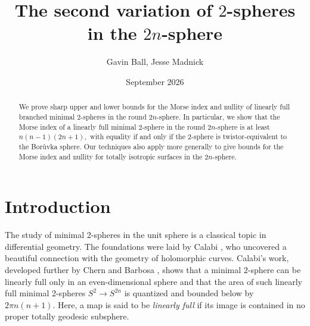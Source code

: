 \documentclass[11pt]{article}
\theoremstyle{definition}
\numberwithin{equation}{section}
\begin{document}
	
\title{The second variation of $2$-spheres in the $2n$-sphere}
	
\author{Gavin Ball, Jesse Madnick}
\date{September 2026}

\newcommand{\Addresses}
{{  \bigskip
\noindent	\textsc{University of Missouri} \par\nopagebreak
\noindent	\textsc{Columbia, MO, United States} \par\nopagebreak
\noindent	\texttt{gavin.ball@missouri.edu} \\

\medskip
\noindent	\textsc{Seton Hall University} \par\nopagebreak
\noindent	\textsc{South Orange, NJ, United States} \par\nopagebreak
\noindent	\texttt{jesse.ochs.madnick@gmail.com} \\
}}
	
\maketitle
	
\begin{abstract}
	We prove sharp upper and lower bounds for the Morse index and nullity of linearly full branched minimal $2$-spheres in the round $2n$-sphere. In particular, we show that the Morse index of a linearly full minimal $2$-sphere in the round $2n$-sphere is at least $n(n-1)(2n+1),$ with equality if and only if the $2$-sphere is twistor-equivalent to the Bor\r{u}vka sphere. Our techniques also apply more generally to give bounds for the Morse index and nullity for totally isotropic surfaces in the $2n$-sphere.
\end{abstract}

{\small
\tableofcontents}
	
\section{Introduction}

\indent \indent The study of minimal 2-spheres in the unit sphere is a classical topic in differential geometry. The foundations  were laid by Calabi \cite{Calabi67}, who uncovered a beautiful connection with the geometry of holomorphic curves. Calabi's work, developed further by Chern \cite{Chern70} and Barbosa \cite{Barbosa75}, shows that a minimal $2$-sphere can be linearly full only in an even-dimensional sphere and that the area of such linearly full minimal 2-spheres $S^2 \to S^{2n}$ is quantized and bounded below by $2 \pi n(n+1).$ Here, a map is said to be \emph{linearly full} if its image is contained in no proper totally geodesic subsphere.
\end{document}
